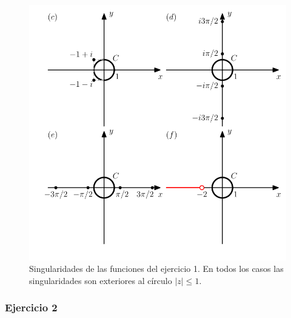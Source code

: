 \documentclass[a4paper]{report}
\begin{document}
\begin{figure}[!htb]
  \begin{minipage}[c]{0.65\textwidth}
    \includegraphics[width=\textwidth]{figuras/exercise_53_01_f.pdf}
  \end{minipage}\hfill
  \begin{minipage}[c]{0.25\textwidth}
    \caption{
       Singularidades de las funciones del ejercicio 1. En todos los casos las singularidades son exteriores al círculo \(|z|\leq1\).
    } \label{fig:exercise_53_01_f}
  \end{minipage}
\end{figure}

\subsubsection*{Ejercicio 2}
\end{document}
